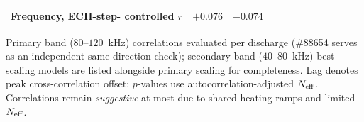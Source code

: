 \begin{table}[H]
\begin{tabular}{lcccccccc}
\shortstack[l]{Frequency, ECH-step-\\controlled $r$} & \multicolumn{4}{c}{$+0.076$} & \multicolumn{4}{c}{$-0.074$} \\
\bottomrule
\end{tabular}
\par\smallskip Primary band ($80\text{--}120$~kHz) correlations evaluated per discharge (\#88654 serves as an independent same-direction check); secondary band ($40\text{--}80$~kHz) best scaling models are listed alongside primary scaling for completeness. Lag denotes peak cross-correlation offset; $p$-values use autocorrelation-adjusted $N_{\rm eff}$. Correlations remain \emph{suggestive} at most due to shared heating ramps and limited $N_{\rm eff}$.
\end{table}
